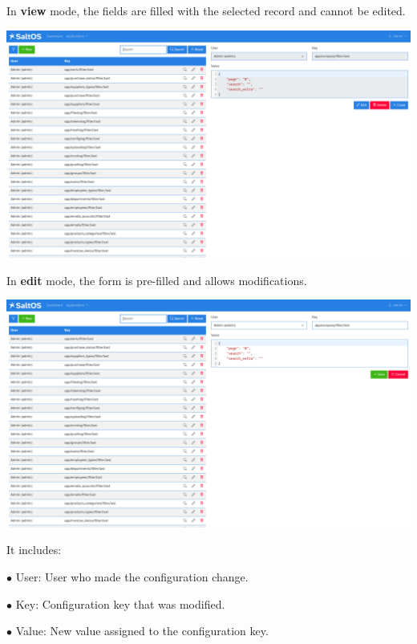 \documentclass[a4paper]{article}
\begin{document}
In \textbf{view} mode, the fields are filled with the selected record and cannot be edited.

\begin{center}\includegraphics[width=1\textwidth]{../ujest/snaps/test-screenshots-js-screenshots-common-configlog-view-10-en-us-1-snap.png}\end{center}

In \textbf{edit} mode, the form is pre-filled and allows modifications.

\begin{center}\includegraphics[width=1\textwidth]{../ujest/snaps/test-screenshots-js-screenshots-common-configlog-edit-10-en-us-1-snap.png}\end{center}

It includes:

\begin{compactitem}
\item[\color{myblue}$\bullet$] User: User who made the configuration change.
\item[\color{myblue}$\bullet$] Key: Configuration key that was modified.
\item[\color{myblue}$\bullet$] Value: New value assigned to the configuration key.
\end{compactitem}
\end{document}
